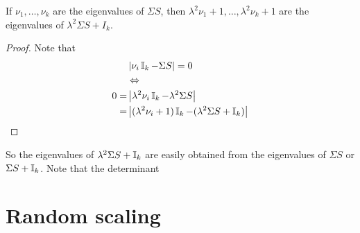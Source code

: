 \documentclass[12pt]{article}
\begin{document}
\begin{lemma}
    If $\nu_1,\ldots,\nu_k$ are the eigenvalues of $\Sigma S$, then $\lambda^2\nu_1+1,\ldots,\lambda^2\nu_k+1$ are the eigenvalues of $\lambda^2 \Sigma S + I_k$. 
\end{lemma}
\begin{proof}
Note that \begin{align*}
    &\left| \nu_i \operatorname{\mathbb{I}}_k - \Sigma S   \right|=0\\
    &\Leftrightarrow\\
    0=&\left| \lambda^2\nu_i \operatorname{\mathbb{I}}_k - \lambda^2\Sigma S   \right|\\
    =&\left| (\lambda^2\nu_i+1) \operatorname{\mathbb{I}}_k - (\lambda^2\Sigma S +\operatorname{\mathbb{I}}_k)  \right|\\\end{align*}
\end{proof}

So the eigenvalues of $\lambda^2\Sigma S + \operatorname{\mathbb{I}}_k$ are easily obtained from the eigenvalues of $\Sigma S$ or $\Sigma S + \operatorname{\mathbb{I}}_k$. Note that the determinant 

\section{Random scaling}
\end{document}
